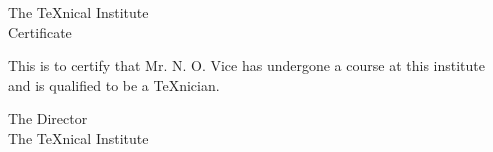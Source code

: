\documentclass{letter}
\begin{document}
\begin{center}
  The \TeX nical Institute\\[.75cm]
    Certificate
\end{center}
\noindent This is to certify that Mr. N. O. Vice has undergone a
course at this institute and is qualified to be a \TeX nician.


\begin{flushright}
  The Director\\
  The \TeX nical Institute
\end{flushright}
\end{document}
